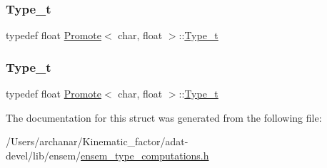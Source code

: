 \subsubsection{\texorpdfstring{Type\_t}{Type\_t}\hspace{0.1cm}{\footnotesize\ttfamily [2/3]}}
{\footnotesize\ttfamily typedef float \mbox{\hyperlink{structPromote}{Promote}}$<$ char, float $>$\+::\mbox{\hyperlink{structPromote_3_01char_00_01float_01_4_a1b84f2980103f92d2d15d421d34d78ea}{Type\+\_\+t}}}

\mbox{\label{structPromote_3_01char_00_01float_01_4_a1b84f2980103f92d2d15d421d34d78ea}} 
\subsubsection{\texorpdfstring{Type\_t}{Type\_t}\hspace{0.1cm}{\footnotesize\ttfamily [3/3]}}
{\footnotesize\ttfamily typedef float \mbox{\hyperlink{structPromote}{Promote}}$<$ char, float $>$\+::\mbox{\hyperlink{structPromote_3_01char_00_01float_01_4_a1b84f2980103f92d2d15d421d34d78ea}{Type\+\_\+t}}}



The documentation for this struct was generated from the following file\+:\begin{DoxyCompactItemize}
\item 
/\+Users/archanar/\+Kinematic\+\_\+factor/adat-\/devel/lib/ensem/\mbox{\hyperlink{adat-devel_2lib_2ensem_2ensem__type__computations_8h}{ensem\+\_\+type\+\_\+computations.\+h}}\end{DoxyCompactItemize}
